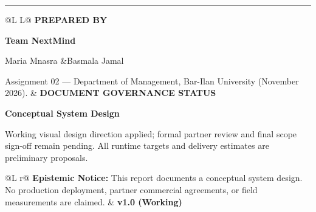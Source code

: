 \vspace{4mm}
\noindent\textcolor{fgAmber}{\rule{48mm}{2pt}}
\vspace{4mm}

\begin{center}
  
\end{center}

\vspace{4mm}

\noindent
\begin{tcolorbox}[
  enhanced,
  colback=fgWhite,
  colframe=fgRuleGray,
  borderline west={4pt}{0pt}{fgOlive},
  boxrule=0.6pt,
  arc=3pt,
  left=10pt, right=10pt, top=7pt, bottom=7pt
]
  \begin{tabularx}{\linewidth}{@{}L L@{}}
    {\footnotesize\textcolor{fgTextAmber}{\textbf{PREPARED BY}}}\par
    \vspace{2pt}
    {\headingfont\large\bfseries\color{fgEspresso} Team NextMind}\par
    {\small\color{fgEspresso} Maria Mnasra \quad\&\quad Basmala Jamal}\par
    {\footnotesize\color{fgEspresso!80} Assignment 02 --- Department of Management, Bar-Ilan University (November 2026).}
    &
    {\footnotesize\textcolor{fgTextAmber}{\textbf{DOCUMENT GOVERNANCE STATUS}}}\par
    \vspace{2pt}
    {\small\color{fgTeal}\textbf{Conceptual System Design}}\par
    {\footnotesize\color{fgEspresso!80} Working visual design direction applied; formal partner review and final scope sign-off remain pending. All runtime targets and delivery estimates are preliminary proposals.}
  \end{tabularx}
\end{tcolorbox}

\vfill

\noindent
\begin{tabularx}{\linewidth}{@{}L r@{}}
  {\footnotesize\color{fgEspresso!80}
    \textbf{Epistemic Notice:} This report documents a conceptual system design. No production deployment, partner commercial agreements, or field measurements are claimed.
  } &
  {\footnotesize\color{fgTeal}\textbf{v1.0 (Working)}}
\end{tabularx}

\clearpage
